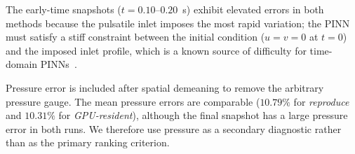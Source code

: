The early-time snapshots ($t=0.10$--$0.20$~s) exhibit elevated errors
in both methods because the pulsatile inlet imposes the most rapid
variation; the PINN must satisfy a stiff constraint between the initial
condition ($u=v=0$ at $t=0$) and the imposed inlet profile, which is a
known source of difficulty for time-domain PINNs~\cite{wang2024causal}.

Pressure error is included after spatial demeaning to remove the arbitrary
pressure gauge.  The mean pressure errors are comparable
($10.79\%$ for \emph{reproduce} and $10.31\%$ for
\emph{GPU-resident}), although the final snapshot has a large pressure error
in both runs.  We therefore use pressure as a secondary diagnostic rather
than as the primary ranking criterion.

